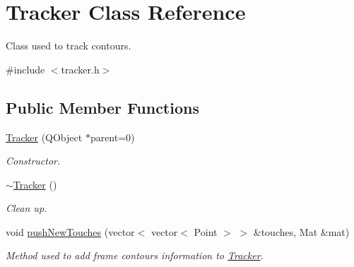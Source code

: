 \hypertarget{class_tracker}{
\section{Tracker Class Reference}
\label{de/dbb/class_tracker}
}


Class used to track contours.  




{\ttfamily \#include $<$tracker.h$>$}

\subsection*{Public Member Functions}
\begin{DoxyCompactItemize}
\item 
\hyperlink{class_tracker_aaa35d70ca4a3920a4ce932467f07e2db}{Tracker} (QObject $\ast$parent=0)
\begin{DoxyCompactList}\small\item\em Constructor. \item\end{DoxyCompactList}\item 
\hypertarget{class_tracker_a0ed1e23312cfe7fcfe5f2ac2abd69163}{
\hyperlink{class_tracker_a0ed1e23312cfe7fcfe5f2ac2abd69163}{$\sim$Tracker} ()}
\label{de/dbb/class_tracker_a0ed1e23312cfe7fcfe5f2ac2abd69163}

\begin{DoxyCompactList}\small\item\em Clean up. \item\end{DoxyCompactList}\item 
void \hyperlink{class_tracker_a790cd55c4884027783b373adf5f1867c}{pushNewTouches} (vector$<$ vector$<$ Point $>$ $>$ \&touches, Mat \&mat)
\begin{DoxyCompactList}\small\item\em Method used to add frame contours information to \hyperlink{class_tracker}{Tracker}. \item\end{DoxyCompactList}\end{DoxyCompactItemize}

